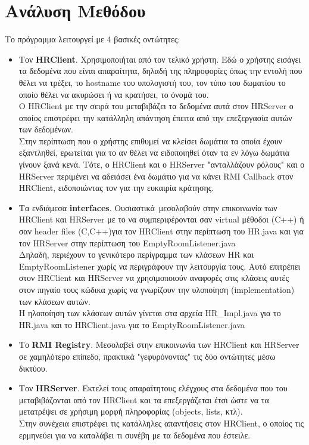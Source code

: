 \section{Ανάλυση Μεθόδου}
Το πρόγραμμα λειτουργεί με 4 βασικές οντώτητες:
\begin{itemize}
    \item Τον \textbf{HRClient}. Χρησιμοποιήται από τον τελικό
        χρήστη. Εδώ ο χρήστης εισάγει τα δεδομένα που είναι απαραίτητα, δηλαδή
        της πληροφορίες όπως την εντολή που θέλει να τρέξει, το hostname του
        υπολογιστή του, τον τύπο του δωματίου το οποίο θέλει να ακυρώσει ή να
        κρατήσει, το όνομά του.
        \\
        Ο HRClient με την σειρά του μεταβιβάζει τα
        δεδομένα αυτά στον HRServer ο οποίος επιστρέφει την κατάλληλη απάντηση
        έπειτα από την επεξεργασία αυτών των δεδομένων.
        \\
        Στην περίπτωση που ο χρήστης επιθυμεί να κλείσει δωμάτια τα οποία έχουν
        εξαντληθεί, ερωτείται για το αν θέλει να ειδοποιηθεί όταν τα εν λόγω
        δωμάτια γίνουν ξανά κενά. Τότε, ο HRClient και ο HRServer "ανταλλάζουν
        ρόλους" και ο HRServer περιμένει να αδειάσει ένα δωμάτιο για να κάνει
        RMI Callback στον HRClient, ειδοποιώντας τον για την ευκαιρία κράτησης.
    \item Τα ενδιάμεσα \textbf{interfaces}. Ουσιαστικά\
        μεσολαβούν στην επικοινωνία των HRClient και HRServer με το να
        συμπεριφέρονται σαν virtual μέθοδοι (C++) ή σαν header files (C,C++)για
        τον HRClient στην περίπτωση του HR.java και για τον HRServer στην
        περίπτωση του EmptyRoomListener.java
        \\
        Δηλαδή, περιέχουν το γενικότερο περίγραμμα των κλάσεων HR και
        EmptyRoomListener χωρίς να περιγράφουν την λειτουργία τους.
        Αυτό επιτρέπει στον HRClient και HRServer να χρησιμοποιούν αναφορές
        στις κλάσεις αυτές στον πηγαίο τους κώδικα χωρίς να γνωρίζουν την
        υλοποίηση (implementation) των κλάσεων αυτών.
        \\
        Η ηλοποίηση των κλάσεων αυτών γίνεται στα αρχεία HR\_Impl.java για το
        HR.java και το HRClient.java για το EmptyRoomListener.java
    \item Το \textbf{RMI Registry}. 
        Μεσολαβεί στην επικοινωνία των HRClient και HRServer σε χαμηλότερο
        επίπεδο, πρακτικά "γεφυρόνοντας" τις δύο οντώτητες μέσω δικτύου.
    \item Τον \textbf{HRServer}.
        Εκτελεί τους απαραίτητους ελέγχους στα δεδομένα που του μεταβιβάζονται
        από τον HRClient και τα επεξεργάζεται έτσι ώστε να τα μετατρέψει σε
        χρήσιμη μορφή πληροφορίας (objects, lists, κτλ).
        \\
        Στην συνέχεια επιστρέφει τις κατάλληλες απαντήσεις στον HRClient, ο
        οποίος τις ερμηνεύει για να καταλάβει τι συνέβη με τα δεδομένα που
        έστειλε.
\end{itemize}
